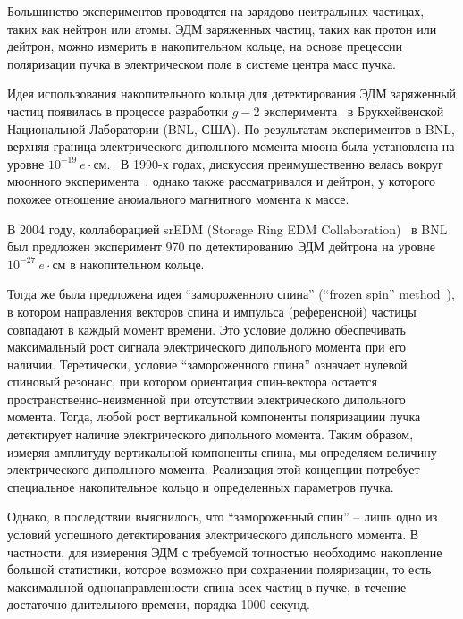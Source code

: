 Большинство экспериментов проводятся на зарядово-неитральных частицах, таких как нейтрон или атомы. ЭДМ заряженных частиц, таких как протон или дейтрон, можно измерить в накопительном кольце, на основе прецессии поляризации пучка в электрическом поле в системе центра масс пучка.

Идея использования накопительного кольца для детектирования ЭДМ заряженный частиц появилась в процессе разработки $g-2$ эксперимента~\cite{BNL:g-2:2001} в Брукхейвенской Национальной Лаборатории (BNL, США). По результатам экспериментов в BNL, верхняя граница электрического дипольного момента мюона была установлена на уровне $10^{-19}~e\cdot$см.~\cite{BNL:muon_ANA:2009} В 1990-х годах, дискуссия преимущественно велась вокруг мюонного эксперимента~\cite{Farley:SREDM:Muon}, однако также рассматривался и дейтрон, у которого похожее отношение аномального магнитного момента к массе.

В 2004 году, коллаборацией srEDM (Storage Ring EDM Collaboration)~\cite{BNL:SREDM} в BNL был предложен эксперимент 970 по детектированию ЭДМ дейтрона на уровне $10^{-27}~e\cdot$см в накопительном кольце. 

Тогда же была предложена идея ``замороженного спина'' (``frozen spin'' method~\cite{Farley:SREDM:Muon}), в котором направления векторов спина и импульса (референсной) частицы совпадают в каждый момент времени. Это условие должно обеспечивать максимальный рост сигнала электрического дипольного момента при его наличии. Теретически, условие ``замороженного спина'' означает нулевой спиновый резонанс, при котором ориентация спин-вектора остается  пространственно-неизменной при отсутствии электрического дипольного момента. Тогда, любой рост вертикальной компоненты поляризациии пучка детектирует наличие электрического дипольного момента. Таким образом, измеряя  амплитуду вертикальной компоненты спина, мы определяем величину электрического дипольного момента. Реализация этой концепции потребует специальное накопительное кольцо и определенных параметров пучка.

Однако, в последствии выяснилось, что ``замороженный спин'' -- лишь одно из условий успешного детектирования электрического дипольного момента. В частности, для измерения ЭДМ с требуемой точностью необходимо накопление большой статистики, которое возможно при сохранении поляризации, то есть максимальной однонаправленности спина всех частиц в пучке, в течение достаточно длительного времени, порядка 1000 секунд. 

